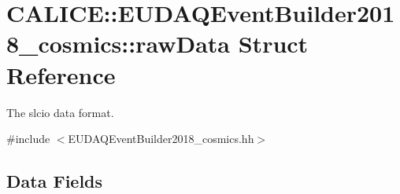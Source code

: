 \section{C\-A\-L\-I\-C\-E\-:\-:E\-U\-D\-A\-Q\-Event\-Builder2018\-\_\-cosmics\-:\-:raw\-Data Struct Reference}
\label{structCALICE_1_1EUDAQEventBuilder2018__cosmics_1_1rawData}


The slcio data format.  




{\ttfamily \#include $<$E\-U\-D\-A\-Q\-Event\-Builder2018\-\_\-cosmics.\-hh$>$}

\subsection*{Data Fields}
